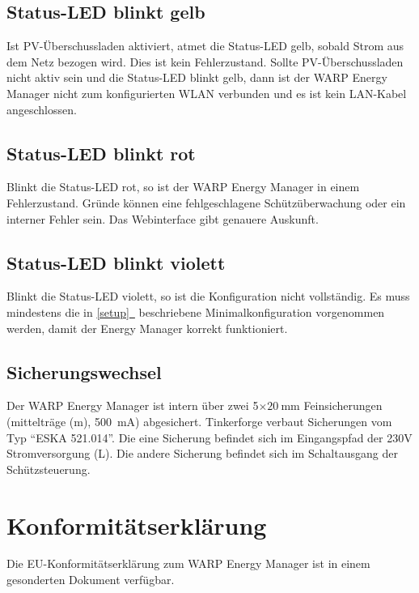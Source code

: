\documentclass[a4paper,10pt]{article}
\newcommand*{\fullref}[1]{\hyperref[{#1}]{\ref*{#1}~\nameref*{#1}}}
\begin{document}
\begin{multicols*}{2}
	\subsection{Status-LED blinkt gelb}
	Ist PV-Überschussladen aktiviert, atmet die Status-LED gelb, sobald Strom
	aus dem Netz bezogen wird. Dies ist kein Fehlerzustand.
	Sollte PV-Überschussladen nicht aktiv sein und die Status-LED blinkt gelb,
	dann ist der WARP Energy Manager nicht zum konfigurierten WLAN verbunden und es ist kein LAN-Kabel angeschlossen.

	\subsection{Status-LED blinkt rot}
	Blinkt die Status-LED rot, so ist der WARP Energy Manager in einem
	Fehlerzustand. Gründe können eine fehlgeschlagene Schützüberwachung oder ein
	interner Fehler sein. Das Webinterface gibt genauere Auskunft.

	\subsection{Status-LED blinkt violett}
	Blinkt die Status-LED violett, so ist die Konfiguration nicht vollständig. Es muss mindestens die in \fullref{setup} beschriebene Minimalkonfiguration vorgenommen werden, damit der Energy Manager korrekt funktioniert.

	\subsection{Sicherungswechsel}
	Der WARP Energy Manager ist intern über zwei 5$\times\SI{20}{\milli\meter}$ Feinsicherungen (mittelträge (m), \SI{500}{\milli\ampere}) abgesichert.
	Tinkerforge verbaut Sicherungen vom Typ \enquote{ESKA 521.014}. Die eine
	Sicherung befindet sich im Eingangspfad der 230V Stromversorgung (L). Die
	andere Sicherung befindet sich im Schaltausgang der Schützsteuerung.

	\section{Konformitätserklärung}
	Die EU-Konformitätserklärung zum WARP Energy Manager ist in einem gesonderten Dokument verfügbar.


\end{multicols*}
\end{document}
